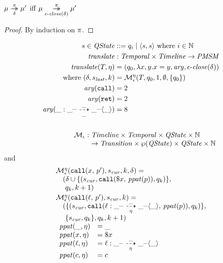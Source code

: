 \begin{lemma}
  $\mu \overset{\pi}{\underset{\delta}{\to\!\!\!\!\!\to}} \mu'$ iff
  $\mu \overset{\pi}{\underset{\epsilon\text{-}\mathit{close}(\delta)}{\to\!\!\!\!\!\to}} \mu'$
\end{lemma}
\begin{proof}
  By induction on $\pi$.
\end{proof}
%
\begin{align*}
 s \in \QState &::= q_i \alt \pmsmpair{s}{s} \text{ where } i \in \Nat
\\
 \translateeps &: \TContract \times \Timeline \to \PMSM
\\
 \translateeps(\mtcon, \mtimeline) &= (\pmsmq_0, \lambda x,y . x = y, \ary, \epsclose(\delta)) \\
 \text{where }
   (\delta, \pmsmqlast, k) &= \epshelp^\mtimeline(\mtcon, \pmsmq_0, 1, \emptyset, \setof{\pmsmq_0})
\\
   \ary(\apvcallalone) &= 2 \\
   \ary(\apvretalone) &= 2 \\
   \ary(\bclos{\swc}{\swc}{\swc}{\swc}{\swc}{\swc}{\swc}{\swc}) &= 8 \\
\\
\begin{array}{l}
    \epshelp :  \Timeline \times \TContract \times \QState \times \Nat \\ \phantom{\epshelp :}\to \mathit{Transition} \times \wp(\QState) \times \QState \times \Nat
\end{array}\span\omit
\end{align*}
and
\begin{align*}
\begin{array}{l}
  \epshelp^\mtimeline(\scallev{\mvar}{\mvpat'}, \pmsmqcur, k, \delta) = \\
\quad           (\delta
            \cup \setof{(\pmsmqcur,
                         \apvcall{\sref{\mvar}}{\vpatToPattern(\mvpat)},
                         \pmsmq_k)}, \\
\quad            \ \pmsmq_k, k+1)
\\[2pt]
%
  \epshelp^\mtimeline(\scallev{\mtoplevelname}{\mvpat'}, \pmsmqcur, k) = \\
\quad           (\setof{(\pmsmqcur,
                         \apvcall{\bclos{\mtoplevelname}{\swc}{\swc}{\swc}{\mtimeline}{\swc}{\swc}{\swc}}{\vpatToPattern(\mvpat)},
                         \pmsmq_k)}, \\
\quad            \ \setof{\pmsmqcur, \pmsmq_k}, \pmsmq_k, k+1)
\\
\begin{array}{ll}
  \vpatToPattern(\swc, \mtimeline) &= \swc
\\
  \vpatToPattern(\mvar, \mtimeline) &= \sref{\mvar}
\\
  \vpatToPattern(\mtoplevelname, \mtimeline) &= \bclos{\mtoplevelname}{\swc}{\swc}{\swc}{\mtimeline}{\swc}{\swc}{\swc} \\
  \vpatToPattern(\mconstant, \mtimeline) &= \mconstant
\end{array}
\end{array}
\end{align*}
